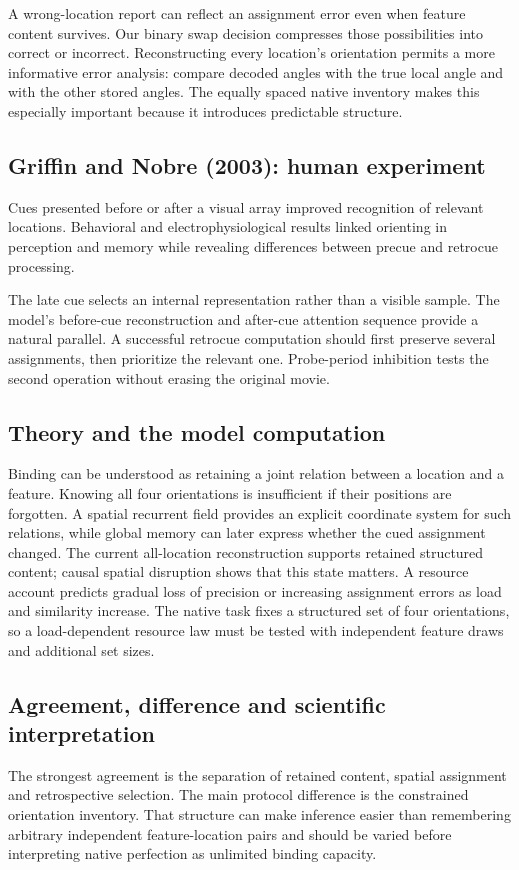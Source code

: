 \documentclass[11pt]{article}
\begin{document}
A wrong-location report can reflect an assignment error even when feature content survives. Our binary swap decision compresses those possibilities into correct or incorrect. Reconstructing every location’s orientation permits a more informative error analysis: compare decoded angles with the true local angle and with the other stored angles. The equally spaced native inventory makes this especially important because it introduces predictable structure.

\subsection{Griffin and Nobre (2003): human experiment}
Cues presented before or after a visual array improved recognition of relevant locations. Behavioral and electrophysiological results linked orienting in perception and memory while revealing differences between precue and retrocue processing. \cite{bio_griffin}

The late cue selects an internal representation rather than a visible sample. The model’s before-cue reconstruction and after-cue attention sequence provide a natural parallel. A successful retrocue computation should first preserve several assignments, then prioritize the relevant one. Probe-period inhibition tests the second operation without erasing the original movie.

\subsection{Theory and the model computation}
Binding can be understood as retaining a joint relation between a location and a feature. Knowing all four orientations is insufficient if their positions are forgotten. A spatial recurrent field provides an explicit coordinate system for such relations, while global memory can later express whether the cued assignment changed. The current all-location reconstruction supports retained structured content; causal spatial disruption shows that this state matters. A resource account predicts gradual loss of precision or increasing assignment errors as load and similarity increase. The native task fixes a structured set of four orientations, so a load-dependent resource law must be tested with independent feature draws and additional set sizes.

\subsection{Agreement, difference and scientific interpretation}
The strongest agreement is the separation of retained content, spatial assignment and retrospective selection. The main protocol difference is the constrained orientation inventory. That structure can make inference easier than remembering arbitrary independent feature-location pairs and should be varied before interpreting native perfection as unlimited binding capacity.
\end{document}
